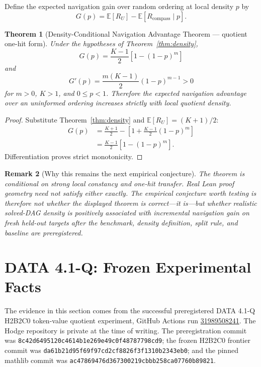 \documentclass[11pt]{article}
\newtheorem{theorem}{Theorem}[section]
\newtheorem{remark}[theorem]{Remark}
\newcommand{\E}{\mathbb{E}}
\begin{document}
Define the expected navigation gain over random ordering at local density $p$ by
\[
G(p)=\E[R_U]-\E[R_{\mathrm{compass}}\mid p].
\]

\begin{theorem}[Density-Conditional Navigation Advantage Theorem --- quotient one-hit form]
\label{thm:conditional}
Under the hypotheses of Theorem~\ref{thm:density},
\[
\boxed{
G(p)=\frac{K-1}{2}\left[1-(1-p)^m\right]
}
\]
and
\[
G'(p)=\frac{m(K-1)}{2}(1-p)^{m-1}>0
\]
for $m>0$, $K>1$, and $0\le p<1$. Therefore the expected navigation advantage over an uninformed ordering increases strictly with local quotient density.
\end{theorem}

\begin{proof}
Substitute Theorem~\ref{thm:density} and $\E[R_U]=(K+1)/2$:
\begin{align*}
G(p)
&=\frac{K+1}{2}-\left[1+\frac{K-1}{2}(1-p)^m\right]\\
&=\frac{K-1}{2}\left[1-(1-p)^m\right].
\end{align*}
Differentiation proves strict monotonicity.
\end{proof}

\begin{remark}[Why this remains the next empirical conjecture]
The theorem is conditional on strong local constancy and one-hit transfer. Real Lean proof geometry need not satisfy either exactly. The empirical conjecture worth testing is therefore not whether the displayed theorem is correct---it is---but whether realistic solved-DAG density is positively associated with \emph{incremental navigation gain} on fresh held-out targets after the benchmark, density definition, split rule, and baseline are preregistered.
\end{remark}

\section{DATA 4.1-Q: Frozen Experimental Facts}

The evidence in this section comes from the successful preregistered DATA 4.1-Q H2B2C0 token-value quotient experiment, GitHub Actions run \href{https://github.com/btenneson/Hodge/actions/runs/31989508241}{31989508241}. The Hodge repository is private at the time of writing. The preregistration commit was
\texttt{8c42d6495120c4614b1e269e49c0f48787798cd9}; the frozen H2B2C0 frontier commit was \texttt{da61b21d95f69f97cd2cf8826f3f1310b2343eb0}; and the pinned mathlib commit was \texttt{ac47869476d367300219cbbb258ca07760b89821}.
\end{document}
